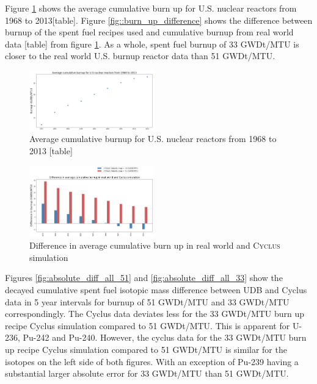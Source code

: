 \documentclass{anstrans}
\newcommand{\Cyclus}{\textsc{Cyclus}\xspace}%
\begin{document}
Figure \ref{fig:burn_up_real}  shows the average cumulative burn up for U.S. nuclear reactors from 1968 to 2013[table]. Figure \ref{fig::burn_up_difference} shows the difference between burnup of the spent fuel recipes used and cumulative burnup from real world data [table] from figure \ref{fig:burn_up_real}. As a whole, spent fuel burnup of 33 GWDt/MTU is closer to the real world U.S. burnup reactor data than 51 GWDt/MTU. 

\begin{figure}[h] %
	\centering
	\includegraphics[width=0.48\textwidth]{burn_up_real}
	\caption{Average cumulative burnup for U.S. nuclear reactors from 1968 to 2013 [table]}
	\label{fig:burn_up_real}
\end{figure} 

\begin{figure}[h] %
	\centering
	\includegraphics[width=0.48\textwidth]{burn_up_difference}
	\caption{Difference in average cumulative burn up in real world and \Cyclus simulation}
	\label{fig:burn_up_difference}
\end{figure} 

Figures \ref{fig:absolute_diff_all_51} and \ref{fig:absolute_diff_all_33} show the decayed cumulative spent fuel isotopic mass difference between UDB and Cyclus data in 5 year intervals for burnup of 51 GWDt/MTU and 33 GWDt/MTU correspondingly. The Cyclus data deviates less for the 33 GWDt/MTU burn up recipe Cyclus simulation compared to 51 GWDt/MTU. This is apparent for U-236, Pu-242 and Pu-240. However, the cyclus data for the 33 GWDt/MTU burn up recipe Cyclus simulation compared to 51 GWDt/MTU is similar for the isotopes on the left side of both figures. With an exception of Pu-239 having a substantial larger absolute error for 33 GWDt/MTU than 51 GWDt/MTU. 
\end{document}
